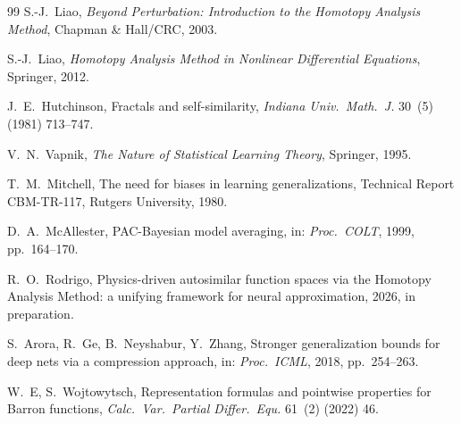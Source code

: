 \documentclass[12pt]{article}
\begin{document}
\begin{thebibliography}{99}
S.-J.~Liao,
\emph{Beyond Perturbation: Introduction to the Homotopy Analysis
Method}, Chapman \& Hall/CRC, 2003.

S.-J.~Liao,
\emph{Homotopy Analysis Method in Nonlinear Differential Equations},
Springer, 2012.

J.~E.~Hutchinson,
Fractals and self-similarity,
\emph{Indiana Univ.\ Math.\ J.} 30~(5) (1981) 713--747.

V.~N.~Vapnik,
\emph{The Nature of Statistical Learning Theory}, Springer, 1995.

T.~M.~Mitchell,
The need for biases in learning generalizations,
Technical Report CBM-TR-117, Rutgers University, 1980.

D.~A.~McAllester,
PAC-Bayesian model averaging,
in: \emph{Proc.\ COLT}, 1999, pp.~164--170.

R.~O.~Rodrigo,
Physics-driven autosimilar function spaces via the Homotopy Analysis
Method: a unifying framework for neural approximation,
2026, in preparation.

S.~Arora, R.~Ge, B.~Neyshabur, Y.~Zhang,
Stronger generalization bounds for deep nets via a compression
approach,
in: \emph{Proc.\ ICML}, 2018, pp.~254--263.

W.~E, S.~Wojtowytsch,
Representation formulas and pointwise properties for Barron
functions,
\emph{Calc.\ Var.\ Partial Differ.\ Equ.} 61~(2) (2022) 46.

\end{thebibliography}
\end{document}
